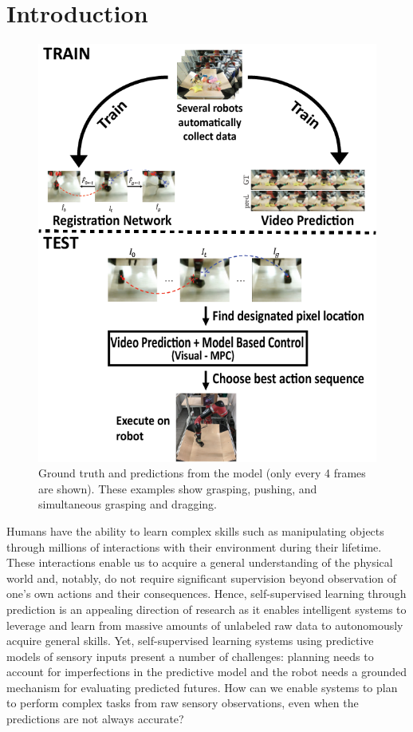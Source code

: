\section{Introduction}

\begin{figure}
\vspace{-5mm}
\centering
\includegraphics[width=0.4\columnwidth,trim={3.2mm 0 0 0},clip]{images/new_overview}
\caption{\small{Ground truth and predictions from the model (only every 4 frames are shown). These examples show grasping, pushing, and simultaneous grasping and dragging. }}
\label{fig:video_prediction}
\vspace{-0.2in}
\end{figure}

Humans have the ability to learn complex skills such as manipulating objects through millions of interactions with their environment during their lifetime.
These interactions enable us to acquire a general understanding of the physical world and, notably, do not require significant supervision beyond observation of one's own actions and their consequences. Hence, self-supervised learning through prediction is an appealing direction of research as it enables intelligent systems to leverage and learn from massive amounts of unlabeled raw data to autonomously acquire general skills. Yet, self-supervised learning systems using predictive models of sensory inputs present a number of challenges: planning needs to account for imperfections in the predictive model and the robot needs a grounded mechanism for evaluating predicted futures.
How can we enable systems to plan to perform complex tasks from raw sensory observations, even when the predictions are not always accurate?

